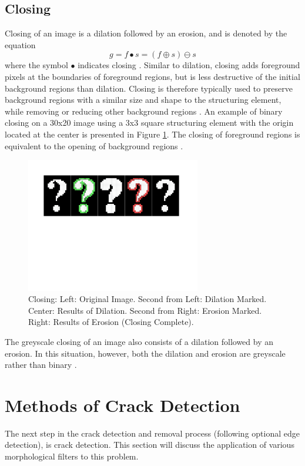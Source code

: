 \documentclass{sig-alternate}
\begin{document}
\subsection{Closing}\label{closing}
Closing of an image is a dilation followed by an erosion, and is denoted by the equation
\begin{equation*}
g = f \bullet s = (f \oplus s) \ominus s
\end{equation*}
where the symbol $\bullet$ indicates closing \cite{MorphologyWikiAnonymous, MorphologyBook:2000}. Similar to dilation, closing adds foreground pixels at the boundaries of foreground regions, but is less destructive of the initial background regions than dilation. Closing is therefore typically used to preserve background regions with a similar size and shape to the structuring element, while removing or reducing other background regions \cite{MorphologyWiki}. An example of binary closing on a 30x20 image using a 3x3 square structuring element with the origin located at the center is presented in Figure \ref{binary closing figure}. The closing of foreground regions is equivalent to the opening of background regions \cite{MorphologyWiki}.
\begin{figure}
\centering
\includegraphics[width=3in,trim={0 4.75in 0 0},clip]{closing}
\caption{Closing: Left: Original Image. Second from Left: Dilation Marked. Center: Results of Dilation. Second from Right: Erosion Marked. Right: Results of Erosion (Closing Complete).}
\label{binary closing figure}
\end{figure}

The greyscale closing of an image also consists of a dilation followed by an erosion. In this situation, however, both the dilation and erosion are greyscale rather than binary \cite{MorphologyPaper:1987}.

\section{Methods of Crack Detection}\label{crack detection}
The next step in the crack detection and removal process (following optional edge detection), is crack detection. This section will discuss the application of various morphological filters to this problem.
\end{document}
